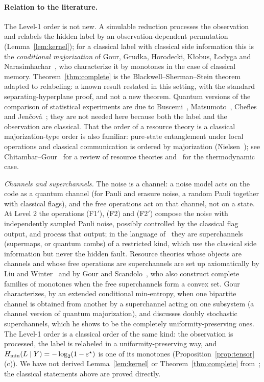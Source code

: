 \paragraph{Relation to the literature.}
The Level-1 order is not new. A simulable reduction processes the observation and relabels the hidden label by an observation-dependent permutation (Lemma~\ref{lem:kernel}); for a classical label with classical side information this is the \emph{conditional majorization} of Gour, Grudka, Horodecki, K\l{}obus, \L{}odyga and Narasimhachar~\cite{GGHKLN}, who characterize it by monotones in the case of classical memory.
Theorem~\ref{thm:complete} is the Blackwell--Sherman--Stein theorem~\cite{Blackwell,Torgersen} adapted to relabeling: a known result restated in this setting, with the standard separating-hyperplane proof, and not a new theorem.
Quantum versions of the comparison of statistical experiments are due to Buscemi~\cite{Buscemi12}, Matsumoto~\cite{Matsumoto}, Chefles~\cite{Chefles} and Jen\v{c}ov\'a~\cite{Jencova}; they are not needed here because both the label and the observation are classical.
That the order of a resource theory is a classical majorization-type order is also familiar: pure-state entanglement under local operations and classical communication is ordered by majorization (Nielsen~\cite{Nielsen}); see Chitambar--Gour~\cite{ChitambarGour} for a review of resource theories and~\cite{GMNSH} for the thermodynamic case.

\emph{Channels and superchannels.} The noise is a channel: a noise model acts on the code as a quantum channel (for Pauli and erasure noise, a random Pauli together with classical flags), and the free operations act on that channel, not on a state. At Level 2 the operations (F1$'$), (F2) and (F2$'$) compose the noise with independently sampled Pauli noise, possibly controlled by the classical flag output, and process that output; in the language of~\cite{CDP08,CDP09} they are superchannels (supermaps, or quantum combs) of a restricted kind, which use the classical side information but never the hidden fault. Resource theories whose objects are channels and whose free operations are superchannels are set up axiomatically by Liu and Winter~\cite{LiuWinter} and by Gour and Scandolo~\cite{GourScandolo}, who also construct complete families of monotones when the free superchannels form a convex set. Gour~\cite{Gour19} characterizes, by an extended conditional min-entropy, when one bipartite channel is obtained from another by a superchannel acting on one subsystem (a channel version of quantum majorization), and discusses doubly stochastic superchannels, which he shows to be the completely uniformity-preserving ones. The Level-1 order is a classical order of the same kind: the observation is processed, the label is relabeled in a uniformity-preserving way, and $H_{\min}(L\mid Y)=-\log_2(1-\varepsilon^{\star})$ is one of its monotones (Proposition~\ref{prop:tensor}(c)). We have not derived Lemma~\ref{lem:kernel} or Theorem~\ref{thm:complete} from~\cite{Gour19}; the classical statements above are proved directly.

